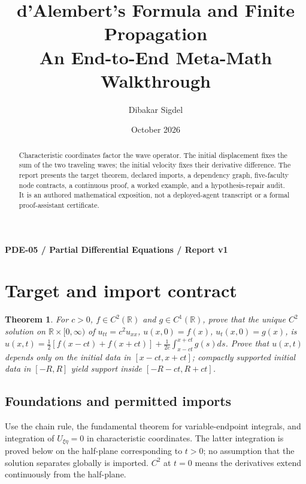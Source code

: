 \documentclass[preprint,12pt,aps,pra,showkeys,amsmath,amssymb,superscriptaddress,floatfix]{revtex4-2}
\newtheorem{theorem}{Theorem}[section]
\theoremstyle{definition}
\theoremstyle{remark}
\begin{document}
\title{d'Alembert's Formula and Finite Propagation\\[4pt]\large An End-to-End Meta-Math Walkthrough}

\author{Dibakar Sigdel}


\date{October 2026}

\begin{abstract}

Characteristic coordinates factor the wave operator. The initial
displacement fixes the sum of the two traveling waves; the initial
velocity fixes their derivative difference. The report presents the
target theorem, declared imports, a dependency graph, five-faculty node
contracts, a continuous proof, a worked example, and a hypothesis-repair
audit. It is an authored mathematical exposition, not a deployed-agent
transcript or a formal proof-assistant certificate.

\end{abstract}\maketitle\linespread{1.12}\selectfont

\noindent\textbf{PDE-05 / Partial Differential Equations / Report v1}

\section{Target and import contract}

\begin{theorem}

For \(c>0\), \(f\in C^2(\mathbb R)\) and \(g\in C^1(\mathbb R)\), prove
that the unique \(C^2\) solution on \(\mathbb R\times[0,\infty)\) of
\(u_{tt}=c^2u_{xx}\), \(u(x,0)=f(x)\), \(u_t(x,0)=g(x)\), is
\(u(x,t)=\tfrac12[f(x-ct)+f(x+ct)]+\tfrac1{2c}\int_{x-ct}^{x+ct}g(s)ds\).
Prove that \(u(x,t)\) depends only on the initial data in
\([x-ct,x+ct]\); compactly supported initial data in \([-R,R]\) yield
support inside \([-R-ct,R+ct]\).

\end{theorem}

\subsection{Foundations and permitted imports}

Use the chain rule, the fundamental theorem for variable-endpoint
integrals, and integration of \(U_{\xi\eta}=0\) in characteristic
coordinates. The latter integration is proved below on the half-plane
corresponding to \(t>0\); no assumption that the solution separates
globally is imported. \(C^2\) at \(t=0\) means the derivatives extend
continuously from the half-plane.
\end{document}
